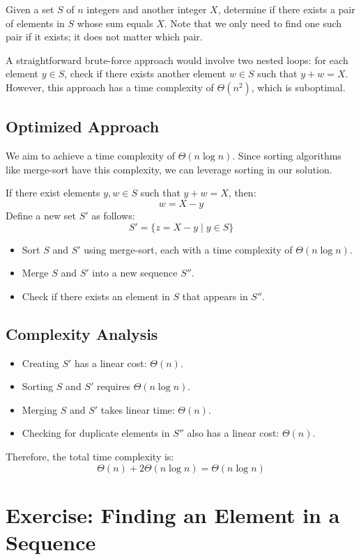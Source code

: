 Given a set \(S\) of \(n\) integers and another integer \(X\), determine if there exists a pair of elements in \(S\) whose sum equals \(X\). Note that we only need to find one such pair if it exists; it does not matter which pair.

A straightforward brute-force approach would involve two nested loops: for each element \(y \in S\), check if there exists another element \(w \in S\) such that \(y + w = X\). However, this approach has a time complexity of \(\Theta(n^2)\), which is suboptimal.

\subsection{Optimized Approach}
We aim to achieve a time complexity of \(\Theta(n \log n)\). Since sorting algorithms like merge-sort have this complexity, we can leverage sorting in our solution.

If there exist elements \(y, w \in S\) such that \(y + w = X\), then:
\[
w = X - y
\]
Define a new set \(S'\) as follows:
\[
            S' = \{z = X - y \mid y \in S\}
            \]
\begin{itemize}
    \item Sort \(S\) and \(S'\) using merge-sort, each with a time complexity of \(\Theta(n \log n)\).
    \item Merge \(S\) and \(S'\) into a new sequence \(S''\).
    \item Check if there exists an element in \(S\) that appears in \(S''\).
\end{itemize}

\subsection{Complexity Analysis}
\begin{itemize}
    \item Creating \(S'\) has a linear cost: \(\Theta(n)\).
    \item Sorting \(S\) and \(S'\) requires \(\Theta(n \log n)\).
    \item Merging \(S\) and \(S'\) takes linear time: \(\Theta(n)\).
    \item Checking for duplicate elements in \(S''\) also has a linear cost: \(\Theta(n)\).
\end{itemize}

Therefore, the total time complexity is:
\[
\Theta(n) + 2 \Theta(n \log n) = \Theta(n \log n)
\]

\section{Exercise: Finding an Element in a Sequence}

